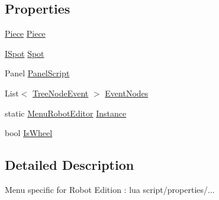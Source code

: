 \subsection*{Properties}
\begin{DoxyCompactItemize}
\item 
\hyperlink{classgearit_1_1src_1_1robot_1_1_piece}{Piece} \hyperlink{classgearit_1_1src_1_1_g_u_i_1_1_menu_robot_editor_abbd044d173971e9110df39ad1c5fb6fc}{Piece}
\item 
\hyperlink{interfacegearit_1_1src_1_1robot_1_1_i_spot}{I\+Spot} \hyperlink{classgearit_1_1src_1_1_g_u_i_1_1_menu_robot_editor_af6b5827eb1e2b200dea135df84e7053a}{Spot}
\item 
Panel \hyperlink{classgearit_1_1src_1_1_g_u_i_1_1_menu_robot_editor_ab809a64f84579ba9a7504963d9884459}{Panel\+Script}
\item 
List$<$ \hyperlink{classgearit_1_1src_1_1_g_u_i_1_1_tree_node_event}{Tree\+Node\+Event} $>$ \hyperlink{classgearit_1_1src_1_1_g_u_i_1_1_menu_robot_editor_ad13f3c32d16d1a8e42cc0a858a21dbc5}{Event\+Nodes}
\item 
static \hyperlink{classgearit_1_1src_1_1_g_u_i_1_1_menu_robot_editor}{Menu\+Robot\+Editor} \hyperlink{classgearit_1_1src_1_1_g_u_i_1_1_menu_robot_editor_a6c62e3d2a7a21edc84617d816b106613}{Instance}
\item 
bool \hyperlink{classgearit_1_1src_1_1_g_u_i_1_1_menu_robot_editor_a6cc59d6cf6e8afed139f95e9356557b8}{Is\+Wheel}
\end{DoxyCompactItemize}


\subsection{Detailed Description}
Menu specific for Robot Edition \+: lua script/properties/... 



